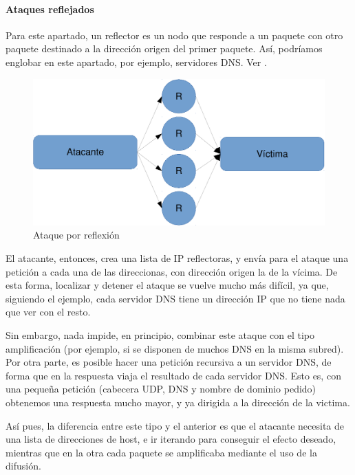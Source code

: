 \paragraph{Ataques reflejados}\mbox{\newline} 

\noindent Para este apartado, un reflector es un nodo que responde a un paquete con otro paquete destinado a la 
dirección origen del primer paquete. Así, podríamos englobar en este apartado, por ejemplo, servidores \gls{DNS}. 
Ver .

\begin{figure}[htbp]
\centering
\includegraphics[width=.8\textwidth]{CapituloDDoS/Figuras/Reflexion}
\caption{Ataque por reflexión}
\end{figure}
%

El atacante, entonces, crea una lista de IP reflectoras, y envía para el ataque una petición a cada una de las 
direccionas, con dirección origen la de la vícima. De esta forma, localizar y detener el ataque se vuelve mucho más 
difícil, ya que, siguiendo el ejemplo, cada servidor \gls{DNS} tiene un dirección IP que no tiene nada que ver con el resto.

Sin embargo, nada impide, en principio, combinar este ataque con el tipo amplificación (por ejemplo, si se 
disponen de muchos \gls{DNS} en la misma subred). Por otra parte, es posible hacer una petición recursiva a un servidor \gls{DNS}, 
de forma que en la respuesta viaja el resultado de cada servidor \gls{DNS}. Esto es, con una pequeña petición (cabecera \gls{UDP}, 
\gls{DNS} y nombre de dominio pedido) obtenemos una respuesta mucho mayor, y ya dirigida a la dirección de la victima. 

Así pues, la diferencia entre este tipo y el anterior es que el atacante necesita de una lista de direcciones de host, 
e ir iterando para conseguir el efecto deseado, mientras que en la otra cada paquete se amplificaba mediante el uso de 
la difusión.

